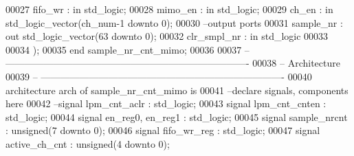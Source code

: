 \begin{DoxyCode}
00027         \textcolor{vhdlchar}{fifo_wr}   \textcolor{vhdlchar}{:} \textcolor{keywordflow}{in} \textcolor{comment}{std\_logic};
00028         \textcolor{vhdlchar}{mimo_en}   \textcolor{vhdlchar}{:} \textcolor{keywordflow}{in} \textcolor{comment}{std\_logic};
00029         \textcolor{vhdlchar}{ch_en}     \textcolor{vhdlchar}{:} \textcolor{keywordflow}{in} \textcolor{comment}{std\_logic\_vector}\textcolor{vhdlchar}{(}\textcolor{vhdlchar}{ch_num}\textcolor{vhdlchar}{-}\textcolor{vhdllogic}{}\textcolor{vhdllogic}{1} \textcolor{keywordflow}{downto} \textcolor{vhdllogic}{}\textcolor{vhdllogic}{0}\textcolor{vhdlchar}{)};
00030 \textcolor{keyword}{                  --output ports }
00031         \textcolor{vhdlchar}{sample_nr} \textcolor{vhdlchar}{:} \textcolor{keywordflow}{out} \textcolor{comment}{std\_logic\_vector}\textcolor{vhdlchar}{(}\textcolor{vhdllogic}{}\textcolor{vhdllogic}{63} \textcolor{keywordflow}{downto} \textcolor{vhdllogic}{}\textcolor{vhdllogic}{0}\textcolor{vhdlchar}{)};
00032           \textcolor{vhdlchar}{clr_smpl_nr}   \textcolor{vhdlchar}{:} \textcolor{keywordflow}{in} \textcolor{comment}{std\_logic}
00033 
00034         \textcolor{vhdlchar}{)};
00035 \textcolor{keywordflow}{end} \textcolor{vhdlchar}{sample\_nr\_cnt\_mimo};
00036 
00037 \textcolor{keyword}{-- ----------------------------------------------------------------------------}
00038 \textcolor{keyword}{-- Architecture}
00039 \textcolor{keyword}{-- ----------------------------------------------------------------------------}
00040 \textcolor{keywordflow}{architecture} arch \textcolor{keywordflow}{of} sample_nr_cnt_mimo is
00041 \textcolor{keyword}{--declare signals,  components here}
00042 \textcolor{keyword}{--signal lpm\_cnt\_aclr       : std\_logic;}
00043 \textcolor{keywordflow}{signal} \textcolor{vhdlchar}{lpm_cnt_cnten}    \textcolor{vhdlchar}{:} \textcolor{comment}{std\_logic};
00044 \textcolor{keywordflow}{signal} \textcolor{vhdlchar}{en_reg0}\textcolor{vhdlchar}{,} \textcolor{vhdlchar}{en_reg1} \textcolor{vhdlchar}{:} \textcolor{comment}{std\_logic};
00045 \textcolor{keywordflow}{signal} \textcolor{vhdlchar}{sample_nrcnt}     \textcolor{vhdlchar}{:} \textcolor{comment}{unsigned}\textcolor{vhdlchar}{(}\textcolor{vhdllogic}{}\textcolor{vhdllogic}{7} \textcolor{keywordflow}{downto} \textcolor{vhdllogic}{}\textcolor{vhdllogic}{0}\textcolor{vhdlchar}{)};
00046 \textcolor{keywordflow}{signal} \textcolor{vhdlchar}{fifo_wr_reg}      \textcolor{vhdlchar}{:} \textcolor{comment}{std\_logic};
00047 \textcolor{keywordflow}{signal} \textcolor{vhdlchar}{active_ch_cnt}    \textcolor{vhdlchar}{:} \textcolor{comment}{unsigned}\textcolor{vhdlchar}{(}\textcolor{vhdllogic}{}\textcolor{vhdllogic}{4} \textcolor{keywordflow}{downto} \textcolor{vhdllogic}{}\textcolor{vhdllogic}{0}\textcolor{vhdlchar}{)};

\end{DoxyCode}

